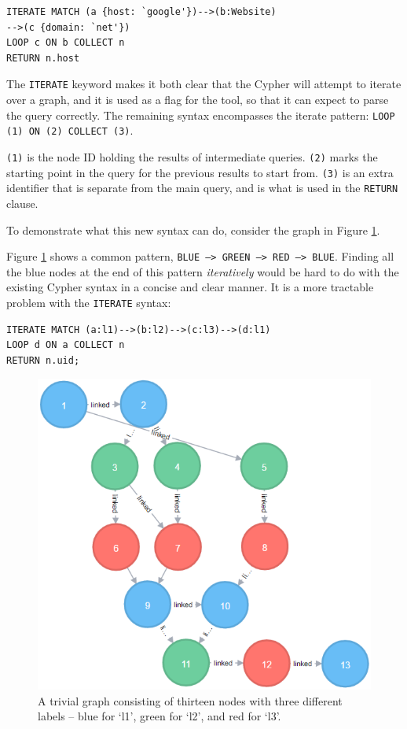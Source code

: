 \documentclass[letterpaper]{ltxdoc}
\begin{document}
\begin{lstlisting}[language=Cypher]
ITERATE MATCH (a {host: `google'})-->(b:Website)
-->(c {domain: `net'})
LOOP c ON b COLLECT n
RETURN n.host
\end{lstlisting}

The \texttt{ITERATE} keyword makes it both clear that the Cypher will attempt to iterate over a graph, and it is used as a flag for the tool, so that it can expect to parse the query correctly. The remaining syntax encompasses the iterate pattern: \texttt{LOOP (1) ON (2) COLLECT (3)}.

\texttt{(1)} is the node ID holding the results of intermediate queries. \texttt{(2)} marks the starting point in the query for the previous results to start from. \texttt{(3)} is an extra identifier that is separate from the main query, and is what is used in the \texttt{RETURN} clause.

To demonstrate what this new syntax can do, consider the graph in Figure \ref{iterGraphFig}.

Figure \ref{iterGraphFig} shows a common pattern, \texttt{BLUE --> GREEN --> RED --> BLUE}. Finding all the blue nodes at the end of this pattern \emph{iteratively} would be hard to do with the existing Cypher syntax in a concise and clear manner. It is a more tractable problem with the \texttt{ITERATE} syntax:

\begin{lstlisting}[language = Cypher]
ITERATE MATCH (a:l1)-->(b:l2)-->(c:l3)-->(d:l1)
LOOP d ON a COLLECT n
RETURN n.uid;
\end{lstlisting}

\begin{figure}[h]
\centerline{\includegraphics[scale=0.7]{iterateGraph.png}}
\caption{A trivial graph consisting of thirteen nodes with three different labels -- blue for `l1', green for `l2', and red for `l3'.}
\label{iterGraphFig}
\end{figure}
\end{document}
